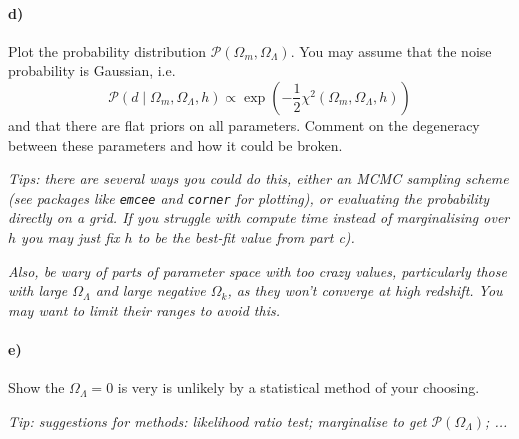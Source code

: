 \documentclass[12pt]{article}
\begin{document}
\paragraph{d)}
Plot the probability distribution $\mathcal{P}(\Omega_m, \Omega_\Lambda)$. You may assume that the noise probability is Gaussian, i.e.
\begin{equation}
\mathcal{P}(d \mid \Omega_m, \Omega_\Lambda, h) \propto \exp{\left(-\frac{1}{2}\chi^2(\Omega_m, \Omega_\Lambda, h)\right)}
\end{equation}
and that there are flat priors on all parameters. Comment on the degeneracy between these parameters and how it could be broken.

\emph{Tips: there are several ways you could do this, either an MCMC sampling scheme (see packages like \texttt{emcee} and \texttt{corner} for plotting), or evaluating the probability directly on a grid. If you struggle with compute time instead of marginalising over $h$ you may just fix $h$ to be the best-fit value from part c).}

\emph{Also, be wary of parts of parameter space with too crazy values, particularly those with large $\Omega_\Lambda$ and large negative $\Omega_k$, as they won't converge at high redshift. You may want to limit their ranges to avoid this.
}

\paragraph{e)}
Show the $\Omega_\Lambda = 0$ is very is unlikely by a statistical method of your choosing.

\emph{Tip: suggestions for methods: likelihood ratio test; marginalise to get $\mathcal{P}(\Omega_\Lambda)$; ...}
\end{document}
